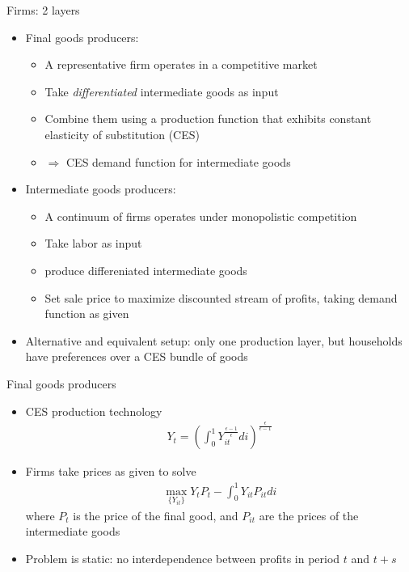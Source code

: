 \documentclass[9pt,xcolor={dvipsnames}]{beamer}
\newcommand{\bit}{\begin{itemize}}
\newcommand{\eit}{\end{itemize}}
\newcommand{\bc}{\color{blue}}
\begin{document}
\begin{frame}{Firms: 2 layers}

\bit
\setlength\itemsep{1.5em}

\item Final goods producers:
\bit
\setlength\itemsep{0.5em}
\item A representative firm operates in a competitive market 

\item Take \emph{differentiated} intermediate goods as input

\item Combine them using a production function that exhibits {\bc constant elasticity of substitution (CES)}

\item $\Rightarrow$ CES demand function for intermediate goods
\eit

\item Intermediate goods producers:
\bit
\setlength\itemsep{0.5em}
	\item A continuum of firms operates under monopolistic competition

	\item Take labor as input
	
	\item produce differeniated intermediate goods
	
	\item Set sale price to maximize discounted stream of profits, taking demand function as given
\eit

\item Alternative and equivalent setup: only one production layer, but households have preferences over a CES bundle of goods

\eit

\end{frame}


\begin{frame}{Final goods producers}

\bit
\setlength\itemsep{1.5em}

\item CES production technology
\begin{eqnarray}
Y_t = \left(\int_{0}^{1} Y_{it}^{\frac{\epsilon-1}{\epsilon}} di \right)^{\frac{\epsilon}{\epsilon-1}} \nonumber
\end{eqnarray}

\item Firms take prices as given to solve
\begin{eqnarray}
\max_{\{Y_{it}\}} Y_t P_t - \int_{0}^{1} Y_{it} P_{it} di \nonumber
\end{eqnarray}
where $P_t$ is the price of the final good, and $P_{it}$ are the prices of the intermediate goods

\item Problem is static: no interdependence between profits in period $t$ and $t+s$

\eit

\end{frame}
\end{document}
